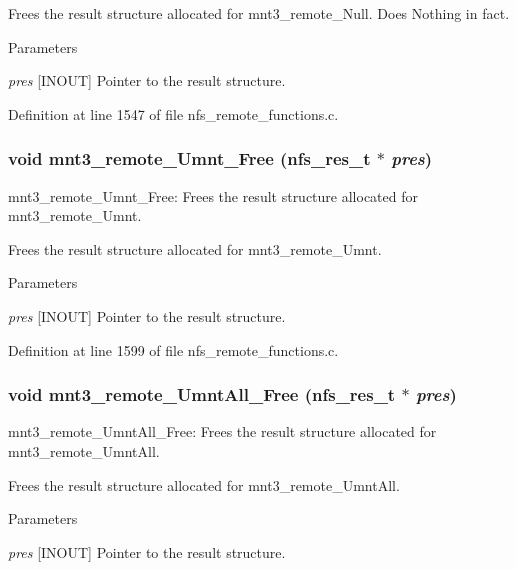 Frees the result structure allocated for mnt3\_\-remote\_\-Null. Does Nothing in fact.


\begin{DoxyParams}{Parameters}
\item[{\em pres}][INOUT] Pointer to the result structure. \end{DoxyParams}


Definition at line 1547 of file nfs\_\-remote\_\-functions.c.
\subsubsection[{mnt3\_\-remote\_\-Umnt\_\-Free}]{\setlength{\rightskip}{0pt plus 5cm}void mnt3\_\-remote\_\-Umnt\_\-Free (nfs\_\-res\_\-t $\ast$ {\em pres})}\label{group__NFSprocs_ga2d3f33d242833d1e1defb036fc190dc0}
mnt3\_\-remote\_\-Umnt\_\-Free: Frees the result structure allocated for mnt3\_\-remote\_\-Umnt.

Frees the result structure allocated for mnt3\_\-remote\_\-Umnt.


\begin{DoxyParams}{Parameters}
\item[{\em pres}][INOUT] Pointer to the result structure. \end{DoxyParams}


Definition at line 1599 of file nfs\_\-remote\_\-functions.c.
\subsubsection[{mnt3\_\-remote\_\-UmntAll\_\-Free}]{\setlength{\rightskip}{0pt plus 5cm}void mnt3\_\-remote\_\-UmntAll\_\-Free (nfs\_\-res\_\-t $\ast$ {\em pres})}\label{group__NFSprocs_gad810cd16dfb6caa29f284d5665c41eaf}
mnt3\_\-remote\_\-UmntAll\_\-Free: Frees the result structure allocated for mnt3\_\-remote\_\-UmntAll.

Frees the result structure allocated for mnt3\_\-remote\_\-UmntAll.


\begin{DoxyParams}{Parameters}
\item[{\em pres}][INOUT] Pointer to the result structure. \end{DoxyParams}



